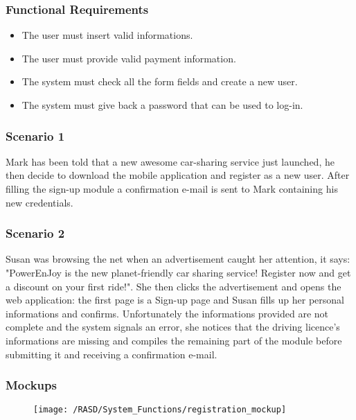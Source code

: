 \subsubsection{Functional Requirements}
\begin{itemize}
  \item The user must insert valid informations.
  \item The user must provide valid payment information.
  \item The system must check all the form fields and create a new user.
  \item The system must give back a password that can be used to log-in.
\end{itemize}


\subsubsection{Scenario 1}
Mark has been told that a new awesome car-sharing service just launched, he then decide to download the mobile application and register as a new user. After filling the sign-up module a confirmation e-mail is sent to Mark containing his new credentials.


\subsubsection{Scenario 2}
Susan was browsing the net when an advertisement caught her attention, it says: "PowerEnJoy is the new planet-friendly car sharing service! Register now and get a discount on your first ride!". She then clicks the advertisement and opens the web application: the first page is a Sign-up page and Susan fills up her personal informations and confirms. Unfortunately the informations provided are not complete and the system signals an error, she notices that the driving licence's informations are missing and compiles the remaining part of the module before submitting it and receiving a confirmation e-mail.


\subsubsection{Mockups}
\begin{figure}[!ht]
  \centering
  \vspace{0.2cm}
  \texttt{[image: /RASD/System\_Functions/registration\_mockup]}\\
  \vspace{0.2cm}
  \label{fig:registration_mockup} 
\end{figure}


